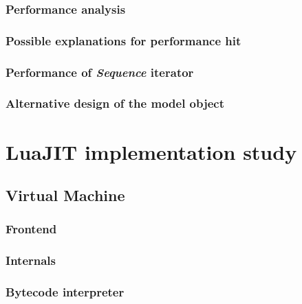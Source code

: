 \documentclass[12pt, oneside]{Thesis}
\begin{document}
    \section{Performance analysis}
    \label{Sec:MO-perf-analys}
    

    \section{Possible explanations for performance hit}
    \label{Sec:MO-insta}
    

    \section{Performance of \emph{Sequence} iterator}
    \label{Sec:MO-perf-iter}
    

    \section{Alternative design of the model object}
    \label{Sec:MO-alt-design}
    

\part{LuaJIT implementation study}
\label{Part:luajit-doc}

  \chapter{Virtual Machine}
  \label{Chapt:VM}

    \section{Frontend}
    \label{Sec:frontend}
    

    \section{Internals}
    \label{Sec:Internals}
    

    \section{Bytecode interpreter}
    \label{Sec:BI}
    
\end{document}
